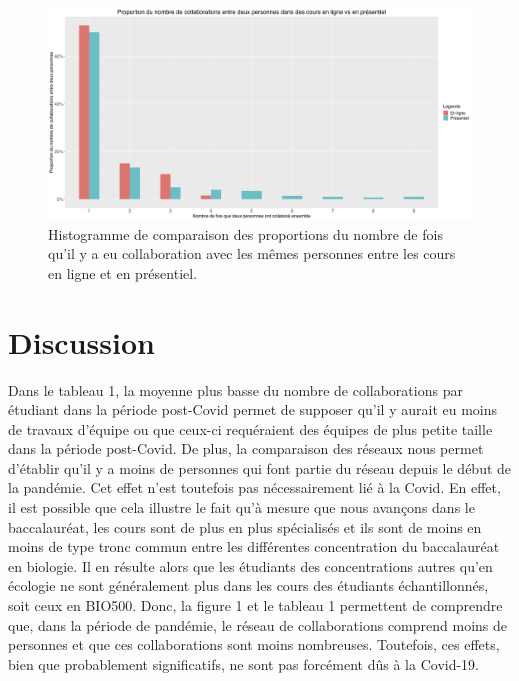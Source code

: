 \documentclass{article}
\begin{document}
 \begin{figure}[bp!]
\centerline{\includegraphics[scale=0.15]{Histogramme3.jpg}}
\caption{Histogramme de comparaison des proportions du nombre de fois qu'il y a eu collaboration avec les mêmes personnes entre les cours en ligne et en présentiel.}
\label{fig}
\end{figure}

\section{Discussion}
Dans le tableau 1, la moyenne plus basse du nombre de collaborations par étudiant dans la période post-Covid permet de supposer qu'il y aurait eu moins de travaux d'équipe ou que ceux-ci requéraient des équipes de plus petite taille dans la période post-Covid. De plus, la comparaison des réseaux nous permet d'établir qu'il y a moins de personnes qui font partie du réseau depuis le début de la pandémie. Cet effet n'est toutefois pas nécessairement lié à la Covid. En effet, il est possible que cela illustre le fait qu'à mesure que nous avançons dans le baccalauréat, les cours sont de plus en plus spécialisés et ils sont de moins en moins de type tronc commun entre les différentes concentration du baccalauréat en biologie. Il en résulte alors que les étudiants des concentrations autres qu'en écologie ne sont généralement plus dans les cours des étudiants échantillonnés, soit ceux en BIO500. Donc, la figure 1 et le tableau 1 permettent de comprendre que, dans la période de pandémie, le réseau de collaborations comprend moins de personnes et que ces collaborations sont moins nombreuses. Toutefois, ces effets, bien que probablement significatifs, ne sont pas forcément dûs à la Covid-19.\\[\baselineskip]
\end{document}

